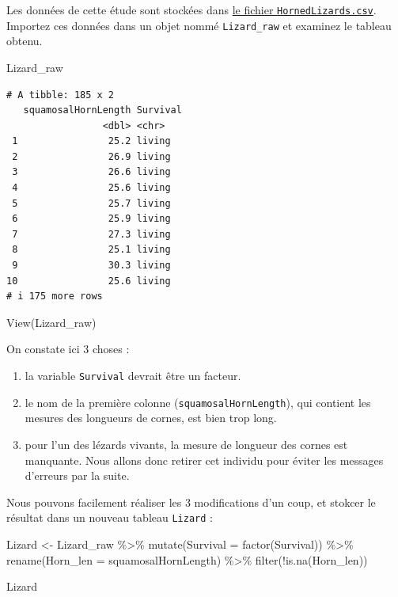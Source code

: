\documentclass[
  a4paper,
  DIV=11,
  numbers=noendperiod,
  oneside]{scrreprt}
\newenvironment{Shaded}{}{}
\newcommand{\AttributeTok}[1]{\textcolor[rgb]{0.84,0.23,0.29}{#1}}
\newcommand{\FunctionTok}[1]{\textcolor[rgb]{0.44,0.26,0.76}{#1}}
\newcommand{\NormalTok}[1]{\textcolor[rgb]{0.14,0.16,0.18}{#1}}
\newcommand{\OtherTok}[1]{\textcolor[rgb]{0.44,0.26,0.76}{#1}}
\newcommand{\SpecialCharTok}[1]{\textcolor[rgb]{0.00,0.36,0.77}{#1}}
\providecommand{\tightlist}{%
  \setlength{\itemsep}{0pt}\setlength{\parskip}{0pt}}\usepackage{longtable,booktabs,array}
\begin{document}
Les données de cette étude sont stockées dans
\href{data/HornedLizards.csv}{le fichier \texttt{HornedLizards.csv}}.
Importez ces données dans un objet nommé \texttt{Lizard\_raw} et
examinez le tableau obtenu.

\begin{Shaded}
\begin{Highlighting}[]
\NormalTok{Lizard\_raw}
\end{Highlighting}
\end{Shaded}

\begin{verbatim}
# A tibble: 185 x 2
   squamosalHornLength Survival
                 <dbl> <chr>   
 1                25.2 living  
 2                26.9 living  
 3                26.6 living  
 4                25.6 living  
 5                25.7 living  
 6                25.9 living  
 7                27.3 living  
 8                25.1 living  
 9                30.3 living  
10                25.6 living  
# i 175 more rows
\end{verbatim}

\begin{Shaded}
\begin{Highlighting}[]
\FunctionTok{View}\NormalTok{(Lizard\_raw)}
\end{Highlighting}
\end{Shaded}

On constate ici 3 choses :

\begin{enumerate}
\def\labelenumi{\arabic{enumi}.}
\tightlist
\item
  la variable \texttt{Survival} devrait être un facteur.
\item
  le nom de la première colonne (\texttt{squamosalHornLength}), qui
  contient les mesures des longueurs de cornes, est bien trop long.
\item
  pour l'un des lézards vivants, la mesure de longueur des cornes est
  manquante. Nous allons donc retirer cet individu pour éviter les
  messages d'erreurs par la suite.
\end{enumerate}

Nous pouvons facilement réaliser les 3 modifications d'un coup, et
stokcer le résultat dans un nouveau tableau \texttt{Lizard} :

\begin{Shaded}
\begin{Highlighting}[]
\NormalTok{Lizard }\OtherTok{\textless{}{-}}\NormalTok{ Lizard\_raw }\SpecialCharTok{\%\textgreater{}\%}
  \FunctionTok{mutate}\NormalTok{(}\AttributeTok{Survival =} \FunctionTok{factor}\NormalTok{(Survival)) }\SpecialCharTok{\%\textgreater{}\%}
  \FunctionTok{rename}\NormalTok{(}\AttributeTok{Horn\_len =}\NormalTok{ squamosalHornLength) }\SpecialCharTok{\%\textgreater{}\%}
  \FunctionTok{filter}\NormalTok{(}\SpecialCharTok{!}\FunctionTok{is.na}\NormalTok{(Horn\_len))}

\NormalTok{Lizard}
\end{Highlighting}
\end{Shaded}
\end{document}
